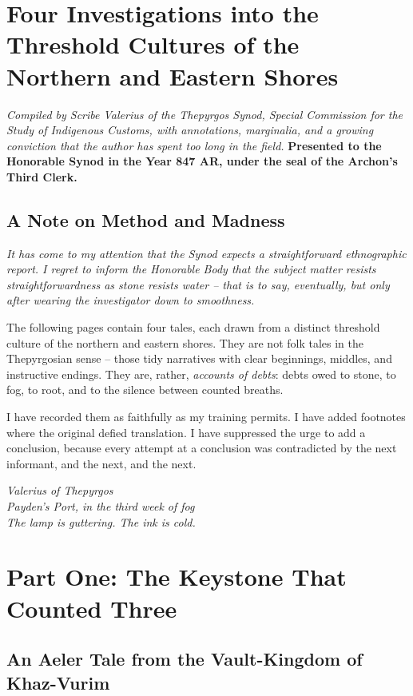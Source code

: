 \documentclass[12pt]{article}
\begin{document}




\section{Four Investigations into the Threshold Cultures of the Northern and Eastern Shores}
\textit{Compiled by Scribe Valerius of the Thepyrgos Synod, Special Commission for the Study of Indigenous Customs, with annotations, marginalia, and a growing conviction that the author has spent too long in the field.}
\textbf{Presented to the Honorable Synod in the Year 847 AR, under the seal of the Archon's Third Clerk.}

\subsection{A Note on Method and Madness}
\textit{It has come to my attention that the Synod expects a straightforward ethnographic report. I regret to inform the Honorable Body that the subject matter resists straightforwardness as stone resists water -- that is to say, eventually, but only after wearing the investigator down to smoothness.}

The following pages contain four tales, each drawn from a distinct threshold culture of the northern and eastern shores. They are not folk tales in the Thepyrgosian sense -- those tidy narratives with clear beginnings, middles, and instructive endings. They are, rather, \textit{accounts of debts}: debts owed to stone, to fog, to root, and to the silence between counted breaths.

I have recorded them as faithfully as my training permits. I have added footnotes where the original defied translation. I have suppressed the urge to add a conclusion, because every attempt at a conclusion was contradicted by the next informant, and the next, and the next.

\textit{Valerius of Thepyrgos}\\
\textit{Payden's Port, in the third week of fog}\\
\textit{The lamp is guttering. The ink is cold.}

\section{Part One: The Keystone That Counted Three}
\subsection{An Aeler Tale from the Vault-Kingdom of Khaz-Vurim}
\end{document}
